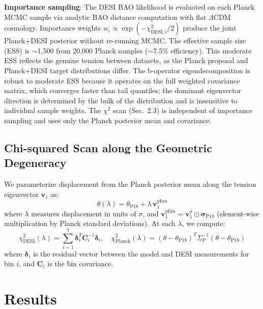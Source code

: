 \documentclass[12pt,preprint]{aastex631}
\newcommand{\szero}[0]{\Sigma_{\mathrm{P}}}
\begin{document}
\textbf{Importance sampling}: The DESI BAO likelihood is evaluated on each Planck MCMC sample via analytic BAO distance computation with flat $\Lambda$CDM cosmology. Importance weights $w_i \propto \exp(-\chi^2_{\mathrm{DESI}, i} / 2)$ produce the joint Planck+DESI posterior without re-running MCMC. The effective sample size (ESS) is $\sim$1,500 from 20,000 Planck samples ($\sim$7.5\% efficiency). This moderate ESS reflects the genuine tension between datasets, as the Planck proposal and Planck+DESI target distributions differ. The b-operator eigendecomposition is robust to moderate ESS because it operates on the full weighted covariance matrix, which converges faster than tail quantiles; the dominant eigenvector direction is determined by the bulk of the distribution and is insensitive to individual sample weights. The $\chi^2$ scan (Sec.~2.3) is independent of importance sampling and uses only the Planck posterior mean and covariance.

\subsection{Chi-squared Scan along the Geometric Degeneracy}

We parameterize displacement from the Planck posterior mean along the tension eigenvector $\mathbf{v}_1$ as:
\begin{equation}
\theta(\lambda) = \theta_{\mathrm{P18}} + \lambda \, \mathbf{v}_1^{\mathrm{phys}}
\label{eq:scan}
\end{equation}
where $\lambda$ measures displacement in units of $\sigma$, and $\mathbf{v}_1^{\mathrm{phys}} = \mathbf{v}_1^{\sigma} \odot \boldsymbol{\sigma}_{\mathrm{P18}}$ (element-wise multiplication by Planck standard deviations). At each $\lambda$, we compute:
\begin{equation}
\chi^2_{\mathrm{DESI}}(\lambda) = \sum_{i=1}^{7} \boldsymbol{\delta}_i^T \mathbf{C}_i^{-1} \boldsymbol{\delta}_i, \quad
\chi^2_{\mathrm{Planck}}(\lambda) = (\theta - \theta_{\mathrm{P18}})^T \szero^{-1} (\theta - \theta_{\mathrm{P18}})
\label{eq:chisq}
\end{equation}
where $\boldsymbol{\delta}_i$ is the residual vector between the model and DESI measurements for bin $i$, and $\mathbf{C}_i$ is the bin covariance.

\section{Results}
\label{sec:results}
\end{document}

